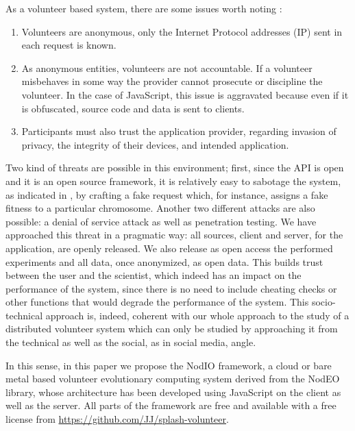 \documentclass[letterpaper]{article}
\begin{document}
As a volunteer based system, there are some issues worth 
noting \citep{sarmenta2001volunteer} :\begin{enumerate}
\item Volunteers are anonymous, only the Internet Protocol addresses (IP) sent in 
each request is known.
\item As anonymous entities, volunteers are not accountable. 
If a volunteer misbehaves in some way the provider cannot 
prosecute or discipline the volunteer. In the case of JavaScript,
this issue is aggravated because even if it is obfuscated, source code
and data is sent to clients. 
\item Participants must also trust the application provider, 
regarding invasion of privacy, the integrity of their devices, 
and intended application. 
\end{enumerate}

Two kind of threats are possible in this environment; first, since the
API is open and it is an open source framework, it is relatively easy to
sabotage the system, as indicated in \citep{domingues2007sabotage}, by
crafting a fake request which, for instance, assigns a fake fitness to
a particular chromosome.
Another two different attacks are also
possible: a denial of service attack as well as penetration
testing. We have approached this threat in a pragmatic way: all
sources, client and server, for the application, are openly released. 
 We also release as open access the performed experiments \citep{DBLP:journals/corr/GuervosG15} 
 and all data, once anonymized, as open data. This
builds trust between the user and the scientist, which indeed has an
impact on the performance of the system, since there is no need to
include cheating checks or other functions that would degrade the
performance of the system. This socio-technical approach is, indeed,
coherent with our whole approach to the study of a distributed volunteer
 system which can only be studied by approaching it from the
technical as well as the social, as in social media, angle. 

In this sense, in this paper we propose the {\sf NodIO} framework, a
cloud or bare metal based volunteer evolutionary computing system
derived from %
 the {\sf NodEO} library, whose architecture has been
developed using JavaScript on the client as well as the server.
All parts of the framework are free and available with a free license
from \url{https://github.com/JJ/splash-volunteer}.
\end{document}
